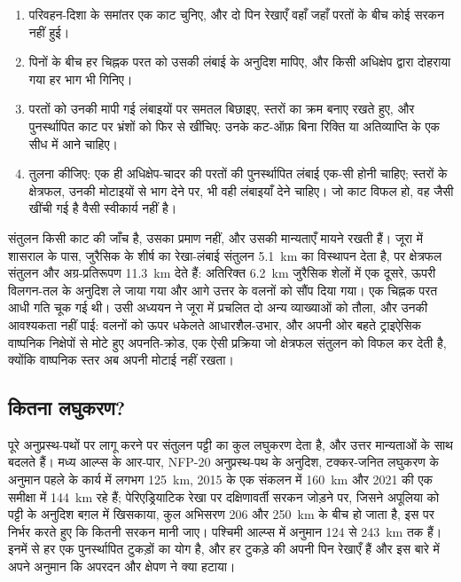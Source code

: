 \begin{method}[किसी अनुप्रस्थ काट का पुनर्स्थापन]\label{met:b2:alpine-orogen:restore}
\begin{enumerate}
\item परिवहन-दिशा के समांतर एक काट चुनिए, और दो पिन रेखाएँ वहाँ जहाँ
परतों के बीच कोई सरकन नहीं हुई।
\item पिनों के बीच हर चिह्नक परत को उसकी लंबाई के अनुदिश मापिए, और किसी अधिक्षेप द्वारा दोहराया गया
हर भाग भी गिनिए।
\item परतों को उनकी मापी गई लंबाइयों पर समतल बिछाइए, स्तरों का क्रम बनाए रखते हुए,
और पुनर्स्थापित काट पर भ्रंशों को फिर से खींचिए: उनके कट-ऑफ़ बिना रिक्ति
या अतिव्याप्ति के एक सीध में आने चाहिए।
\item तुलना कीजिए: एक ही अधिक्षेप-चादर की परतों की पुनर्स्थापित लंबाई एक-सी होनी चाहिए; स्तरों के
क्षेत्रफल, उनकी मोटाइयों से भाग देने पर, भी वही लंबाइयाँ देने चाहिए। जो काट
विफल हो, वह जैसी खींची गई है वैसी स्वीकार्य नहीं है।
\end{enumerate}
\end{method}

संतुलन किसी काट की जाँच है, उसका प्रमाण नहीं, और उसकी मान्यताएँ मायने रखती हैं। जूरा में
शासराल के पास, जुरैसिक के शीर्ष का रेखा-लंबाई संतुलन \qty{5.1}{km} का
विस्थापन देता है, पर क्षेत्रफल संतुलन और अग्र-प्रतिरूपण \qty{11.3}{km} देते हैं: अतिरिक्त
\qty{6.2}{km} जुरैसिक शेलों में एक दूसरे, ऊपरी विलगन-तल के अनुदिश ले जाया गया और
आगे उत्तर के वलनों को सौंप दिया गया। एक चिह्नक परत आधी गति चूक गई थी। उसी अध्ययन ने
जूरा में प्रचलित दो अन्य व्याख्याओं को तौला, और उनकी आवश्यकता नहीं पाई: वलनों को ऊपर धकेलते
आधारशैल-उभार, और अपनी ओर बहते ट्राइऐसिक वाष्पनिक निक्षेपों से मोटे हुए अपनति-क्रोड, एक ऐसी
प्रक्रिया जो क्षेत्रफल संतुलन को विफल कर देती है, क्योंकि वाष्पनिक स्तर अब अपनी मोटाई
नहीं रखता।

\subsection*{कितना लघुकरण?}

पूरे अनुप्रस्थ-पथों पर लागू करने पर संतुलन पट्टी का कुल लघुकरण देता है, और उत्तर
मान्यताओं के साथ बदलते हैं। मध्य आल्प्स के आर-पार, NFP-20 अनुप्रस्थ-पथ के अनुदिश, टक्कर-जनित
लघुकरण के अनुमान पहले के कार्य में लगभग \qty{125}{km}, 2015 के एक संकलन में \qty{160}{km} और
2021 की एक समीक्षा में \qty{144}{km} रहे हैं; पेरिएड्रियाटिक रेखा पर दक्षिणावर्ती सरकन जोड़ने पर, जिसने
अपूलिया को पट्टी के अनुदिश बग़ल में खिसकाया, कुल अभिसरण 206 और
\qty{250}{km} के बीच हो जाता है, इस पर निर्भर करते हुए कि कितनी सरकन मानी जाए। पश्चिमी आल्प्स में अनुमान
124 से \qty{243}{km} तक हैं। इनमें से हर एक पुनर्स्थापित टुकड़ों का योग है, और हर टुकड़े की
अपनी पिन रेखाएँ हैं और इस बारे में अपने अनुमान कि अपरदन और क्षेपण ने क्या हटाया।

